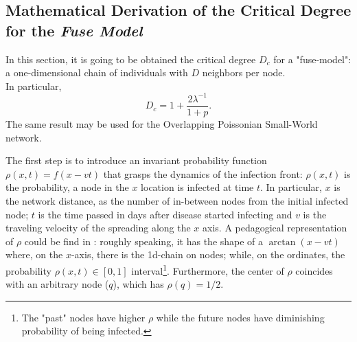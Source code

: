 \documentclass[a4paper,10pt, oneside]{book} %
\theoremstyle{definition}
\begin{document}
\subsection*{Mathematical Derivation of the Critical Degree for the \textit{Fuse Model} }

In this section, it is going to be obtained the critical degree $ D_c$  \cite{Thurner::NetBasedExpl} for a "fuse-model": a one-dimensional chain of individuals with $D$ neighbors per node.
\\In particular, 
\begin{equation}
	D_c = 1 + \frac{2 \lambda^{-1}}{1+p}.
	\label{eq:prelim_Dc_fusemodel}
\end{equation}
The same result may be used for the Overlapping Poissonian Small-World network.

The first step is to introduce an invariant probability function $\rho(x,t) = f(x-vt)$ that grasps the dynamics of the infection front: $\rho(x,t)$ is the probability, a node in the $x$ location is infected at time $t$.
In particular, $x$ is the network distance, as the number of in-between nodes from the initial infected node; $t$ is the time passed in days after disease started infecting and $v$ is the traveling velocity of the spreading along the $x$ axis.
A pedagogical representation of $\rho$ could be find in \cite{Thurner::Appendix_NetBasedExpl}: roughly speaking, it has the shape of a $\arctan(x-vt)$ where, on the $x$-axis, there is the 1d-chain on  nodes; while, on the ordinates, the probability $ \rho(x,t)\in [0,1]$ interval\footnote{The "past" nodes have higher $\rho$ while the future nodes have diminishing probability of being infected.}. Furthermore, the center of $ \rho$ coincides with an arbitrary node ($q$), which has $\rho(q) = 1/2$.
\end{document}
